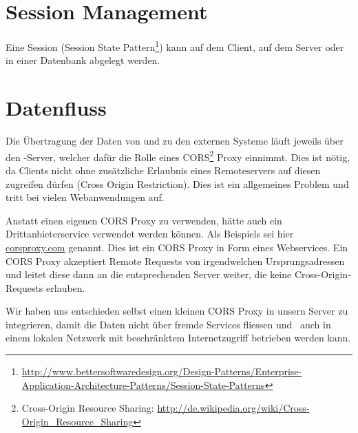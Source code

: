 \section{Session Management}
	Eine Session (Session State Pattern\footnote{\url{http://www.bettersoftwaredesign.org/Design-Patterns/Enterprise-Application-Architecture-Patterns/Session-State-Patterns}}) kann auf dem Client, auf dem Server oder in einer Datenbank abgelegt werden.
	
		
	\section{Datenfluss}			
		Die Übertragung der Daten von und zu den externen Systeme läuft jeweils über den \eeppi-Server, welcher dafür die Rolle eines CORS\footnote{Cross-Origin Resource Sharing: \url{http://de.wikipedia.org/wiki/Cross-Origin_Resource_Sharing}} Proxy einnimmt. 
		Dies ist nötig, da Clients nicht ohne zusätzliche Erlaubnis eines Remoteservers
		auf diesen zugreifen dürfen (Cross Origin Restriction).
		Dies ist ein allgemeines Problem und tritt bei vielen Webanwendungen auf.
		
		Anstatt einen eigenen CORS Proxy zu verwenden, hätte auch ein Drittanbieterservice verwendet werden können.
		Als Beispiels sei hier \hyperlink{http://www.corsproxy.com/}{corsproxy.com} genannt.
		Dies ist ein CORS Proxy in Form eines Webservices.
		Ein CORS Proxy akzeptiert Remote Requests von irgendwelchen Ursprungsadressen und leitet diese dann
		an die entsprechenden Server weiter, die keine Cross-Origin-Requests erlauben.
		
		Wir haben uns entschieden selbst einen kleinen CORS Proxy in unsern Server zu integrieren,
		damit die Daten nicht über fremde Services fliessen und
		\eeppi\ auch in einem lokalen Netzwerk mit beschränktem Internetzugriff betrieben werden kann.
	

